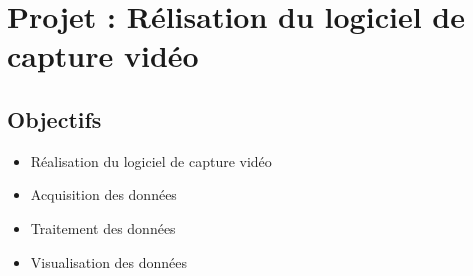     \section{Projet : Rélisation du logiciel de capture vidéo}
        \subsection{Objectifs}
            \begin{itemize}
                \item Réalisation du logiciel de capture vidéo
                \item Acquisition des données
                \item Traitement des données
                \item Visualisation des données
            \end{itemize}